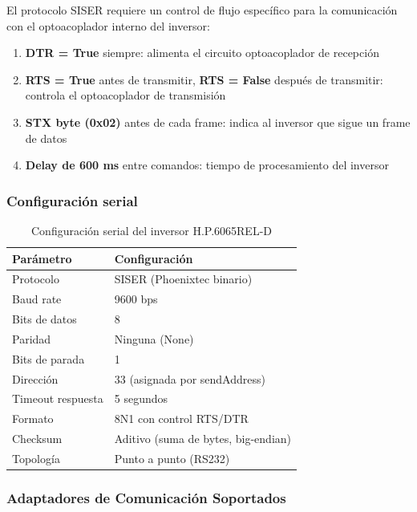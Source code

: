 \documentclass[12pt,a4paper]{article}
\begin{document}
El protocolo SISER requiere un control de flujo espec\'ifico para la comunicaci\'on con el optoacoplador interno del inversor:

\begin{enumerate}
    \item \textbf{DTR = True} siempre: alimenta el circuito optoacoplador de recepci\'on
    \item \textbf{RTS = True} antes de transmitir, \textbf{RTS = False} despu\'es de transmitir: controla el optoacoplador de transmisi\'on
    \item \textbf{STX byte (0x02)} antes de cada frame: indica al inversor que sigue un frame de datos
    \item \textbf{Delay de 600 ms} entre comandos: tiempo de procesamiento del inversor
\end{enumerate}

\subsubsection{Configuraci\'on serial}

\begin{table}[H]
\centering
\begin{tabular}{ll}
\toprule
\textbf{Par\'ametro} & \textbf{Configuraci\'on} \\
\midrule
Protocolo & SISER (Phoenixtec binario) \\
Baud rate & 9600 bps \\
Bits de datos & 8 \\
Paridad & Ninguna (None) \\
Bits de parada & 1 \\
Direcci\'on & 33 (asignada por sendAddress) \\
Timeout respuesta & 5 segundos \\
Formato & 8N1 con control RTS/DTR \\
Checksum & Aditivo (suma de bytes, big-endian) \\
Topolog\'ia & Punto a punto (RS232) \\
\bottomrule
\end{tabular}
\caption{Configuraci\'on serial del inversor H.P.6065REL-D}
\end{table}

\subsubsection{Adaptadores de Comunicaci\'on Soportados}
\end{document}
